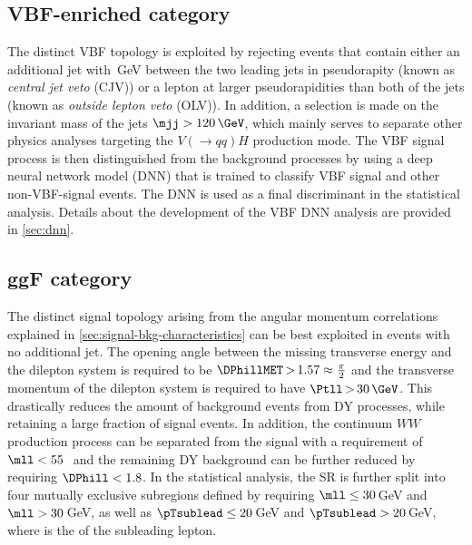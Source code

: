 

\subsection{VBF-enriched \TwoJet category}
\label{subsec:vbf-category}
The distinct VBF topology is exploited by rejecting events that contain either an additional jet with \,GeV between the two leading jets in pseudorapity (known as \emph{central jet veto} (CJV)) or a lepton at larger pseudorapidities than both of the jets (known as \emph{outside lepton veto} (OLV)).
In addition, a selection is made on the invariant mass of the jets $\mjj > 120\,\GeV$, which mainly serves to separate other physics analyses targeting the $V(\to qq)H$ production mode.
The VBF signal process is then distinguished from the background processes by using a deep neural network model (DNN) that is trained to classify VBF signal and other non-VBF-signal events.
The DNN is used as a final discriminant in the statistical analysis. Details about the development of the VBF DNN analysis are provided in \cref{sec:dnn}.


\subsection{ggF \ZeroJet category}
\label{subsec:ggf-zero-jet-category}
The distinct signal topology arising from the angular momentum correlations explained in \cref{sec:signal-bkg-characteristics} can be best exploited in events with no additional jet.
The opening angle between the missing transverse energy and the dilepton system is required to be $\DPhillMET \,{>}\, 1.57 \approx \frac{\pi}{2}$ and the transverse momentum of the dilepton system is required to have $\Ptll \,{>}\, 30\,\GeV$.
This drastically reduces the amount of background events from DY processes, while retaining a large fraction of signal events.
In addition, the continuum $WW$ production process can be separated from the signal with a requirement of $\mll < 55$\,\GeV\ and the remaining DY background can be further reduced by requiring $\DPhill < 1.8$.
In the statistical analysis, the \ZeroJet SR is further split into four mutually exclusive subregions defined by requiring $\mll \le 30$\,GeV and $\mll > 30$\,GeV, as well as $\pTsublead \le 20$\,GeV and $\pTsublead > 20$\,GeV, where \pTsublead is the \pT of the subleading lepton.

